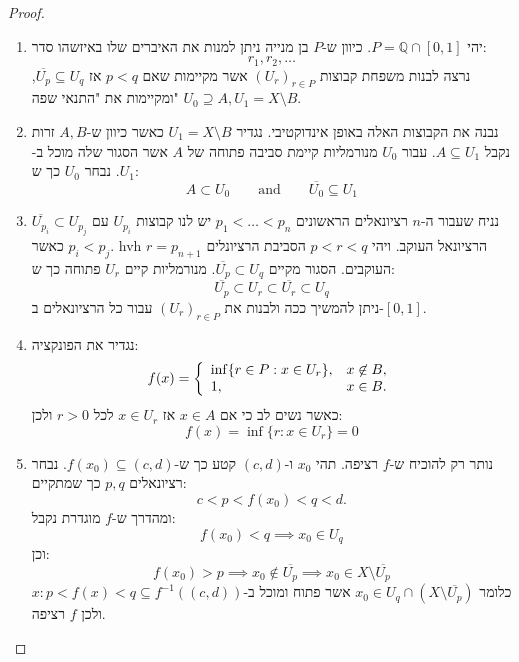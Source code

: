 \documentclass{tstextbook}
\begin{document}
\begin{proof}
  \begin{enumerate}
    \item יהי \(P=\mathbb{Q}\cap [0,1]\). כיוון ש-\(P\) בן מנייה ניתן למנות את האיברים שלו באיזשהו סדר: 
$$r_{1},r_{2},\dots$$
נרצה לבנות משפחת קבוצות \((U_r)_{r \in P}\) אשר מקיימות שאם \(p<q\) אז \(\overline{U_{p}}\subseteq U_{q}\), ומקיימות את "התנאי שפה" \(U_{0}\supseteq A,U_{1}=X\setminus B\).


    \item נבנה את הקבוצות האלה באופן אינדוקטיבי. נגדיר \(U_{1}=X\setminus B\) כאשר כיוון ש-\(A,B\) זרות נקבל \(A\subseteq U_{1}\). עבור \(U_{0}\) מנורמליות קיימת סביבה פתוחה של \(A\) אשר הסגור שלה מוכל ב-\(U_{1}\). נבחר \(U_{0}\) כך ש: 
$$A\subset U_{0}\qquad \text{and}\qquad \overline{U_{0}} \subseteq U_{1}$$


    \item נניח שעבור ה-\(n\) רציונאלים הראשונים \(p_{1}<\dots<p_{n}\) יש לנו קבוצות \(U_{p_{i}}\) עם \(\overline{U_{p_{i}}}\subset U_{p_{j}}\) כאשר \(p_{i}<p_{j}\). hvh \(r=p_{n+1}\) הרציונאל העוקב. ויהי \(p<r<q\) הסביבת הרציונלים העוקבים. הסגור מקיים \(\overline{U_{p}}\subset U_{q}\). מנורמליות קיים \(U_{r}\) פתוחה כך ש: 
$$\overline{{{U_{p}}}}\subset U_{r}\subset\overline{{{U_{r}}}}\subset U_{q}$$
ניתן להמשיך ככה ולבנות את \((U_r)_{r\in P}\) עבור כל הרציונאלים ב-\([0,1]\).


    \item נגדיר את הפונקציה: 
$$f(x)=\left\{\begin{array}{l l}{\operatorname*{inf}\{r\in P:x\in U_{r}\},}&{x\not\in B,}\\ {1,}&{x\in B.}\end{array}\right.$$
כאשר נשים לב כי אם \(x \in A\) אז \(x \in U_{r}\) לכל \(r> 0\) ולכן:
$$f(x)=\inf\{r: x\in U_r\}=0$$


    \item נותר רק להוכיח ש-\(f\) רציפה. תהי \(x_{0}\) ו-\((c,d)\) קטע כך ש-\(f(x_{0})\subseteq(c,d)\). נבחר רציונאלים \(p,q\) כך שמתקיים: 
$$c<p<f(x_{0})<q<d.$$
ומהדרך ש-\(f\) מוגדרת נקבל:
$$f(x_0) < q \implies x_0 \in U_q$$
וכן:
$$f(x_0) > p \implies x_0 \notin \overline{U_p} \implies x_0 \in X \setminus \overline{U_p}$$
כלומר \(x_{0}\in U_{q}\cap\left(X\setminus{\overline{{U_{p}}}}\right)\) אשר פתוח ומוכל ב-\({x : p < f(x) < q} \subseteq f^{-1}((c,d))\) ולכן \(f\) רציפה.


  \end{enumerate}
\end{proof}
\end{document}
